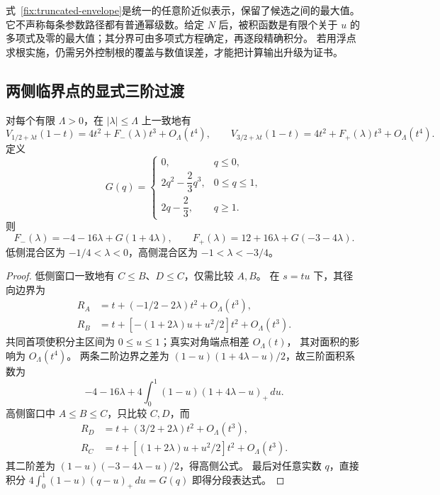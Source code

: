 \begin{remark}
式~\eqref{fix:truncated-envelope}是统一的任意阶近似表示，保留了候选之间的最大值。
它不声称每条参数路径都有普通幂级数。给定 $N$ 后，被积函数是有限个关于 $u$ 的
多项式及零的最大值；其分界可由多项式方程确定，再逐段精确积分。
若用浮点求根实施，仍需另外控制根的覆盖与数值误差，才能把计算输出升级为证书。
\end{remark}

\subsection{两侧临界点的显式三阶过渡}

\begin{corollary}[两侧窗口]\label{fix:side-windows}
对每个有限 $\Lambda>0$，在 $|\lambda|\le\Lambda$ 上一致地有
\[
 V_{1/2+\lambda t}(1-t)=4t^2+F_-(\lambda)t^3+O_\Lambda(t^4),\qquad
 V_{3/2+\lambda t}(1-t)=4t^2+F_+(\lambda)t^3+O_\Lambda(t^4).
\]
定义
\[
 G(q)=\begin{cases}
 0,&q\le0,\\
 2q^2-\dfrac23q^3,&0\le q\le1,\\
 2q-\dfrac23,&q\ge1.
 \end{cases}
\]
则
\begin{equation}\label{fix:side-coefficients}
 F_-(\lambda)=-4-16\lambda+G(1+4\lambda),\qquad
 F_+(\lambda)=12+16\lambda+G(-3-4\lambda).
\end{equation}
低侧混合区为 $-1/4<\lambda<0$，高侧混合区为 $-1<\lambda<-3/4$。
\end{corollary}
\begin{proof}
低侧窗口一致地有 $C\le B$、$D\le C$，仅需比较 $A,B$。
在 $s=tu$ 下，其径向边界为
\begin{align*}
 R_A&=t+(-1/2-2\lambda)t^2+O_\Lambda(t^3),\\
 R_B&=t+[-(1+2\lambda)u+u^2/2]t^2+O_\Lambda(t^3).
\end{align*}
共同首项使积分主区间为 $0\le u\le1$；真实对角端点相差 $O_\Lambda(t)$，
其对面积的影响为 $O_\Lambda(t^4)$。
两条二阶边界之差为 $(1-u)(1+4\lambda-u)/2$，故三阶面积系数为
\[
 -4-16\lambda+4\int_0^1(1-u)(1+4\lambda-u)_+\,du.
\]
高侧窗口中 $A\le B\le C$，只比较 $C,D$，而
\begin{align*}
 R_D&=t+(3/2+2\lambda)t^2+O_\Lambda(t^3),\\
 R_C&=t+[(1+2\lambda)u+u^2/2]t^2+O_\Lambda(t^3).
\end{align*}
其二阶差为 $(1-u)(-3-4\lambda-u)/2$，得高侧公式。
最后对任意实数 $q$，直接积分
$4\int_0^1(1-u)(q-u)_+\,du=G(q)$ 即得分段表达式。
\end{proof}

